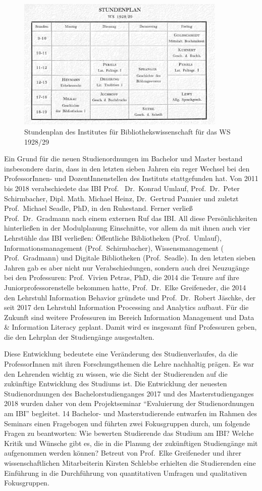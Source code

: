 \documentclass[a4paper,
fontsize=11pt,
oneside,
numbers=noperiodatend,
parskip=half-,
bibliography=totoc,
final
]{scrartcl}
\begin{document}
\begin{figure}
\centering
\includegraphics[width=10cm]{img/Abb1.jpg}
\caption{Stundenplan des Institutes für Bibliothekswissenschaft für das
WS 1928/29}
\end{figure}

Ein Grund für die neuen Studienordnungen im Bachelor und Master bestand
insbesondere darin, dass in den letzten sieben Jahren ein reger Wechsel
bei den ProfessorInnen- und DozentInnenstellen des Instituts
stattgefunden hat. Von 2011 bis 2018 verabschiedete das IBI Prof.~
Dr.~Konrad Umlauf, Prof.~Dr.~Peter Schirmbacher, Dipl. Math. Michael
Heinz, Dr.~Gertrud Pannier und zuletzt Prof.~Michael Seadle, PhD, in den
Ruhestand. Ferner verließ Prof.~Dr.~Gradmann nach einem externen Ruf das
IBI. All diese Persönlichkeiten hinterließen in der Modulplanung
Einschnitte, vor allem da mit ihnen auch vier Lehrstühle das IBI
verließen: Öffentliche Bibliotheken (Prof.~Umlauf),
Informationsmanagement (Prof.~Schirmbacher), Wissensmanagement (
Prof.~Gradmann) und Digitale Bibliotheken (Prof.~Seadle). In den letzten
sieben Jahren gab es aber nicht nur Verabschiedungen, sondern auch drei
Neuzugänge bei den Professuren: Prof.~Vivien Petras, PhD, die 2014 die
Tenure auf ihre Juniorprofessorenstelle bekommen hatte, Prof.~Dr.~Elke
Greifeneder, die 2014 den Lehrstuhl Information Behavior gründete und
Prof.~Dr.~Robert Jäschke, der seit 2017 den Lehrstuhl Information
Processing and Analytics aufbaut. Für die Zukunft sind weitere
Professuren im Bereich Information Management und Data \& Information
Literacy geplant. Damit wird es insgesamt fünf Professuren geben, die
den Lehrplan der Studiengänge ausgestalten.

Diese Entwicklung bedeutete eine Veränderung des Studienverlaufes, da
die ProfessorInnen mit ihren Forschungsthemen die Lehre nachhaltig
prägen. Es war den Lehrenden wichtig zu wissen, wie die Sicht der
Studierenden auf die zukünftige Entwicklung des Studiums ist. Die
Entwicklung der neuesten Studienordnungen des Bachelorstudienganges 2017
und des Masterstudienganges 2018 wurden daher von dem Projektseminar
\enquote{Evaluierung der Studienordnungen am IBI} begleitet. 14
Bachelor- und Masterstudierende entwarfen im Rahmen des Seminars einen
Fragebogen und führten zwei Fokusgruppen durch, um folgende Fragen zu
beantworten: Wie bewerten Studierende das Studium am IBI? Welche Kritik
und Wünsche gibt es, die in die Planung der zukünftigen Studiengänge mit
aufgenommen werden können? Betreut von Prof.~Elke Greifeneder und ihrer
wissenschaftlichen Mitarbeiterin Kirsten Schlebbe erhielten die
Studierenden eine Einführung in die Durchführung von quantitativen
Umfragen und qualitativen Fokusgruppen.
\end{document}
